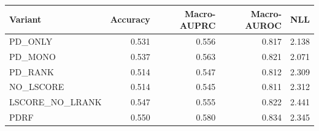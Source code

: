 \begin{tabular}{lrrrr}
\toprule
Variant & Accuracy & Macro-AUPRC & Macro-AUROC & NLL\\
\midrule
PD\_ONLY & 0.531 & 0.556 & 0.817 & 2.138\\
PD\_MONO & 0.537 & 0.563 & 0.821 & 2.071\\
PD\_RANK & 0.514 & 0.547 & 0.812 & 2.309\\
NO\_LSCORE & 0.514 & 0.545 & 0.811 & 2.312\\
LSCORE\_NO\_LRANK & 0.547 & 0.555 & 0.822 & 2.441\\
PDRF & 0.550 & 0.580 & 0.834 & 2.345\\
\bottomrule
\end{tabular}
